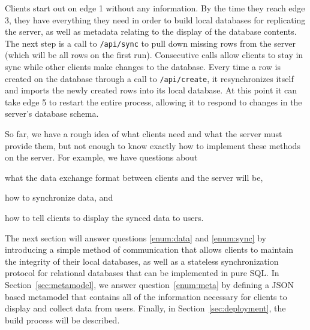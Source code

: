 Clients start out on edge 1 without any information. By the time they reach edge
3, they have everything they need in order to build local databases for
replicating the server, as well as metadata relating to the display of the
database contents. The next step is a call to \texttt{/api/sync} to pull down
missing rows from the server (which will be all rows on the first run).
Consecutive calls allow clients to stay in sync while other clients make
changes to the database. Every time a row is created on the database through
a call to \texttt{/api/create}, it resynchronizes itself and imports the newly
created rows into its local database. At this point it can take edge 5 to
restart the entire process, allowing it to respond to changes in the server's
database schema.

So far, we have a rough idea of what clients need and what the server
must provide them, but not enough to know exactly how to implement these methods
on the server. For example, we have questions about
\begin{inparaenum}
\item\label{enum:data} what the data exchange format between clients and the server will be, 
\item\label{enum:sync} how to synchronize data, and
\item\label{enum:meta} how to tell clients to display the synced data to users. 
\end{inparaenum}

The next section will answer questions \ref{enum:data} and
\ref{enum:sync} by introducing a simple method of communication that allows
clients to maintain the integrity of their local databases, as well as a
stateless synchronization protocol for relational databases that can be
implemented in pure SQL. In Section~\ref{sec:metamodel}, we answer
question~\ref{enum:meta} by defining a JSON based metamodel that contains all of
the information necessary for clients to display and collect data from users.
Finally, in Section~\ref{sec:deployment}, the build process will be described.



